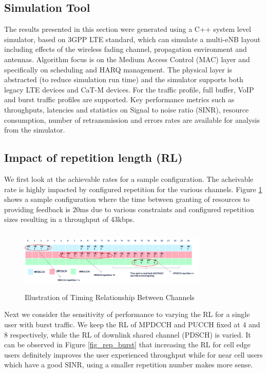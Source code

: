 \documentclass[conference,compsoc]{IEEEtran}
\begin{document}
\subsection{Simulation Tool}
The results presented in this section were generated using a C++ system level simulator, based on $3$GPP LTE standard, which can simulate a multi-eNB layout including effects of the wireless fading channel, propagation environment and antennas. Algorithm focus is on the Medium Access Control (MAC) layer and specifically on scheduling and HARQ management. The physical layer is abstracted (to reduce simulation run time) and the simulator supports both legacy LTE devices and CaT-M devices. For the traffic profile, full buffer, VoIP and burst traffic profiles are supported. Key performance metrics such as throughputs, latencies and statistics on Signal to noise ratio (SINR), resource consumption, number of retransmission and errors rates are available for analysis from the simulator.   

\subsection{Impact of repetition length (RL)}
We first look at the achievable rates for a sample configuration. The acheivable rate is highly impacted by configured repetition for the various channels. Figure \ref{fig_harq_timing2} shows a sample configuration where the time between granting of resources to providing feedback is $20$ms due to various constraints and configured repetition sizes resulting in a throughput of 43kbps. 

\begin{figure}[htbp]
\centerline{\includegraphics[height=30mm,width=90mm]{timing_relation.png}}
\caption{Illustration of Timing Relationship Between Channels}
\label{fig_harq_timing2}
\end{figure}


Next we consider the sensitivity of performance to varying the RL for a single user with burst traffic. We keep the RL of MPDCCH and PUCCH fixed at $4$ and $8$ respectively, while the RL of downlink shared channel (PDSCH) is varied. It can be observed in Figure \ref{fig_rep_burst} that increasing the RL for cell edge users definitely improves the user experienced throughput while for near cell users which have a good SINR, using a smaller repetition number makes more sense.
\end{document}
